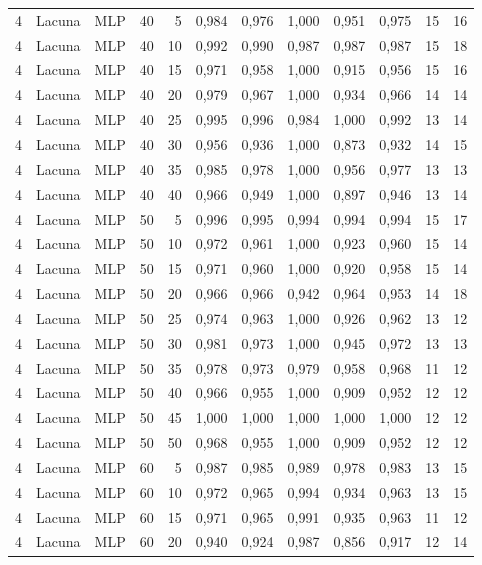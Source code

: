 \begin{longtable}{@{}rllrrrrrrrrr@{}}
4 & Lacuna & MLP & 40 & 5 & 0,984 & 0,976 & 1,000 & 0,951 & 0,975 & 15 & 16 \\
4 & Lacuna & MLP & 40 & 10 & 0,992 & 0,990 & 0,987 & 0,987 & 0,987 & 15 & 18 \\
4 & Lacuna & MLP & 40 & 15 & 0,971 & 0,958 & 1,000 & 0,915 & 0,956 & 15 & 16 \\
4 & Lacuna & MLP & 40 & 20 & 0,979 & 0,967 & 1,000 & 0,934 & 0,966 & 14 & 14 \\
4 & Lacuna & MLP & 40 & 25 & 0,995 & 0,996 & 0,984 & 1,000 & 0,992 & 13 & 14 \\
4 & Lacuna & MLP & 40 & 30 & 0,956 & 0,936 & 1,000 & 0,873 & 0,932 & 14 & 15 \\
4 & Lacuna & MLP & 40 & 35 & 0,985 & 0,978 & 1,000 & 0,956 & 0,977 & 13 & 13 \\
4 & Lacuna & MLP & 40 & 40 & 0,966 & 0,949 & 1,000 & 0,897 & 0,946 & 13 & 14 \\
4 & Lacuna & MLP & 50 & 5 & 0,996 & 0,995 & 0,994 & 0,994 & 0,994 & 15 & 17 \\
4 & Lacuna & MLP & 50 & 10 & 0,972 & 0,961 & 1,000 & 0,923 & 0,960 & 15 & 14 \\
4 & Lacuna & MLP & 50 & 15 & 0,971 & 0,960 & 1,000 & 0,920 & 0,958 & 15 & 14 \\
4 & Lacuna & MLP & 50 & 20 & 0,966 & 0,966 & 0,942 & 0,964 & 0,953 & 14 & 18 \\
4 & Lacuna & MLP & 50 & 25 & 0,974 & 0,963 & 1,000 & 0,926 & 0,962 & 13 & 12 \\
4 & Lacuna & MLP & 50 & 30 & 0,981 & 0,973 & 1,000 & 0,945 & 0,972 & 13 & 13 \\
4 & Lacuna & MLP & 50 & 35 & 0,978 & 0,973 & 0,979 & 0,958 & 0,968 & 11 & 12 \\
4 & Lacuna & MLP & 50 & 40 & 0,966 & 0,955 & 1,000 & 0,909 & 0,952 & 12 & 12 \\
4 & Lacuna & MLP & 50 & 45 & 1,000 & 1,000 & 1,000 & 1,000 & 1,000 & 12 & 12 \\
4 & Lacuna & MLP & 50 & 50 & 0,968 & 0,955 & 1,000 & 0,909 & 0,952 & 12 & 12 \\
4 & Lacuna & MLP & 60 & 5 & 0,987 & 0,985 & 0,989 & 0,978 & 0,983 & 13 & 15 \\
4 & Lacuna & MLP & 60 & 10 & 0,972 & 0,965 & 0,994 & 0,934 & 0,963 & 13 & 15 \\
4 & Lacuna & MLP & 60 & 15 & 0,971 & 0,965 & 0,991 & 0,935 & 0,963 & 11 & 12 \\
4 & Lacuna & MLP & 60 & 20 & 0,940 & 0,924 & 0,987 & 0,856 & 0,917 & 12 & 14 \\

\end{longtable}
